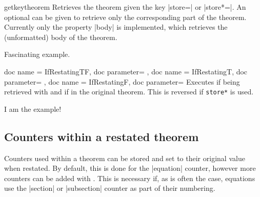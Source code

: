 \documentclass{ltxdoc}
\begin{document}
\begin{docCommand}{getkeytheorem}
  {}
Retrieves the theorem given the key |store=| or |store*=|.
An optional  can be given to retrieve only the corresponding part of the theorem.
Currently only the property |body| is implemented, which retrieves the (unformatted) body of the theorem.

\begin{keythmscode}

\begin{example}[store=mytag]
Fascinating example.
\end{example}

\end{keythmscode}

\end{docCommand}

\begin{docCommands}
  {
    {
      doc name = IfRestatingTF,
      doc parameter=
    },
    {
      doc name = IfRestatingT,
      doc parameter=
    },
    {
      doc name = IfRestatingF,
      doc parameter=
    }
  }
Executes  if being retrieved with  and  if in the original theorem.
This is reversed if \texttt{store*} is used.

\begin{keythmscode}
\begin{example}[store=hmm]
I am the  example!
\end{example}

\end{keythmscode}

\end{docCommands}

\subsection{Counters within a restated theorem}

Counters used within a theorem can be stored and set to their original value when restated.
By default, this is done for the |equation| counter, however more counters can be added with .
This is necessary if, as is often the case, equations use the |section| or |subsection| counter as part of their numbering.
\end{document}
